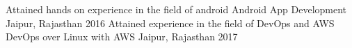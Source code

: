 \begin{cventries}
\cventry
    {Attained hands on experience in the field of android}
    {Android App Development }
    {Jaipur, Rajasthan}
    {2016}
    {
    }
  \cventry
    {Attained experience in the field of DevOps and AWS}
    {DevOps over Linux with AWS}
    {Jaipur, Rajasthan}
    {2017}
    {
    }
\end{cventries}